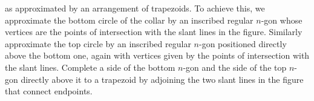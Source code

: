 \documentclass[hints,handout,noauthor,nooutcomes,12pt]{ximera}
\begin{document}
\begin{image}
\end{image}

as approximated by an arrangement of trapezoids. To achieve this, we
approximate the bottom circle of the collar by an inscribed regular $n$-gon
whose vertices are the points of intersection with the slant lines in the
figure. Similarly approximate the top circle by an inscribed regular $n$-gon
positioned directly above the bottom one, again with vertices given by the
points of intersection with the slant lines. Complete a side of the bottom
$n$-gon and the side of the top $n$-gon directly above it to a trapezoid by
adjoining the two slant lines in the figure that connect endpoints.
\end{document}
